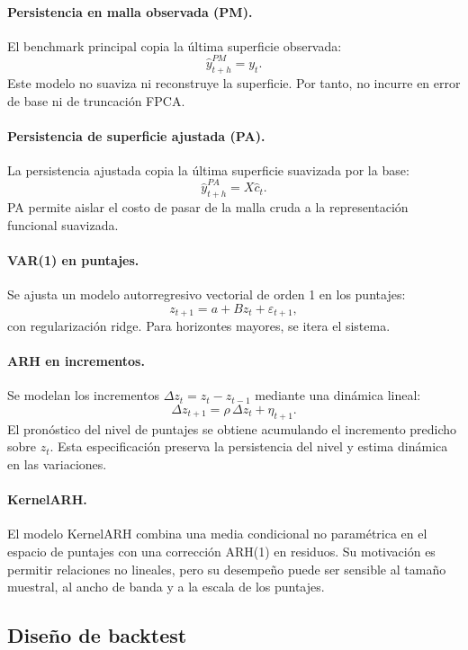 \documentclass[12pt,a4paper]{article}
\begin{document}
\paragraph{Persistencia en malla observada (PM).}
El benchmark principal copia la última superficie observada:
\[
  \widehat y_{t+h}^{PM}=y_t.
\]
Este modelo no suaviza ni reconstruye la superficie. Por tanto, no incurre en error de base ni de truncación FPCA.

\paragraph{Persistencia de superficie ajustada (PA).}
La persistencia ajustada copia la última superficie suavizada por la base:
\[
  \widehat y_{t+h}^{PA}=X\widehat c_t.
\]
PA permite aislar el costo de pasar de la malla cruda a la representación funcional suavizada.

\paragraph{VAR(1) en puntajes.}
Se ajusta un modelo autorregresivo vectorial de orden 1 en los puntajes:
\[
  z_{t+1}=a+Bz_t+\varepsilon_{t+1},
\]
con regularización ridge. Para horizontes mayores, se itera el sistema.

\paragraph{ARH en incrementos.}
Se modelan los incrementos \(\Delta z_t=z_t-z_{t-1}\) mediante una dinámica lineal:
\[
  \Delta z_{t+1}=\rho\,\Delta z_t+\eta_{t+1}.
\]
El pronóstico del nivel de puntajes se obtiene acumulando el incremento predicho sobre \(z_t\). Esta especificación preserva la persistencia del nivel y estima dinámica en las variaciones.

\paragraph{KernelARH.}
El modelo KernelARH combina una media condicional no paramétrica en el espacio de puntajes con una corrección ARH(1) en residuos. Su motivación es permitir relaciones no lineales, pero su desempeño puede ser sensible al tamaño muestral, al ancho de banda y a la escala de los puntajes.

\subsection{Diseño de backtest}
\end{document}
